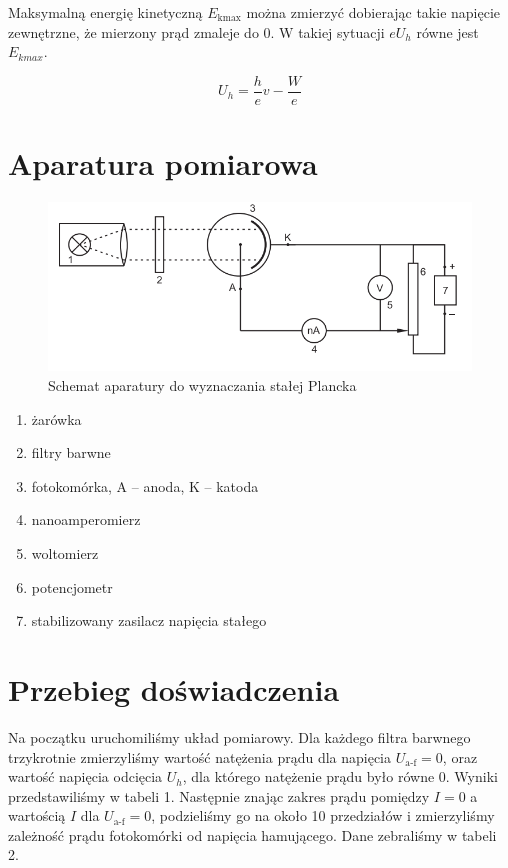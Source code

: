 \documentclass{fizykalab}
\begin{document}
Maksymalną energię kinetyczną $E_\text{kmax}$ można
zmierzyć dobierając takie napięcie zewnętrzne,
że mierzony prąd zmaleje do 
0. W takiej sytuacji $eU_h$ równe jest $E_{kmax}$.

\begin{equation}
    \label{eq:uh}
    U_h = \frac{h}{e} v - \frac{W}{e}
\end{equation}


\section{Aparatura pomiarowa}

\begin{figure}[H]
    \centering
    \includegraphics[width=0.75\linewidth]{aparatura.png}
    \caption{Schemat aparatury do wyznaczania stałej Plancka}
\end{figure}

\begin{enumerate}
    \item żarówka
    \item filtry barwne
    \item fotokomórka, A – anoda, K – katoda
    \item nanoamperomierz
    \item woltomierz
    \item potencjometr
    \item stabilizowany zasilacz napięcia stałego 
\end{enumerate}

\section{Przebieg doświadczenia}
Na początku uruchomiliśmy układ pomiarowy. Dla każdego filtra barwnego 
trzykrotnie zmierzyliśmy wartość 
natężenia prądu dla napięcia $U_\text{a-f} = 0$,
oraz wartość napięcia odcięcia $U_h$, dla którego natężenie
prądu było równe 0.
Wyniki przedstawiliśmy w tabeli 1.
Następnie znając zakres prądu pomiędzy $I = 0$ 
a wartością $I$ dla $U_\text{a-f} = 0$,
podzieliśmy go na około 10 przedziałów i zmierzyliśmy zależność prądu 
fotokomórki od napięcia hamującego. Dane zebraliśmy w tabeli 2.
\end{document}
